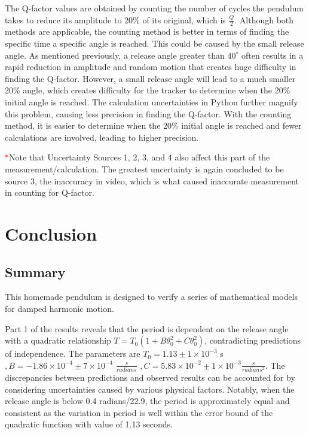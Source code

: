 \documentclass[11pt,titlepage,a4paper,twocolumn]{article}
\begin{document}
            The Q-factor values are obtained by counting the number of cycles the pendulum takes to reduce its amplitude to 20\% of its original, which is $\frac{Q}{2}$. Although both methods are applicable, the counting method is better in terms of finding the specific time a specific angle is reached. This could be caused by the small release angle. As mentioned previously, a release angle greater than $40^\circ$ often results in a rapid reduction in amplitude and random motion that creates huge difficulty in finding the Q-factor. However, a small release angle will lead to a much smaller 20\% angle, which creates difficulty for the tracker to determine when the 20\% initial angle is reached. The calculation uncertainties in Python further magnify this problem, causing less precision in finding the Q-factor. With the counting method, it is easier to determine when the 20\% initial angle is reached and fewer calculations are involved, leading to higher precision.

            \textcolor{red}{*}Note that Uncertainty Sources 1, 2, 3, and 4 also affect this part of the measurement/calculation. The greatest uncertainty is again concluded to be source 3, the inaccuracy in video, which is what caused inaccurate measurement in counting for Q-factor.

\section{Conclusion}
    \subsection{Summary}
        \hspace{\parindent}\hspace{\parindent}This homemade pendulum is designed to verify a series of mathematical models for damped harmonic motion. 
        
        Part 1 of the results reveals that the period is dependent on the release angle with a quadratic relationship $T = T_0(1 + B\theta_0^2 + C\theta_0^2)$, contradicting predictions of independence. The parameters are $T_0 = 1.13  \pm 1\times10^{-3} $ s $, B = -1.86\times10^{-4}  \pm 7\times10^{-4}$ $\frac{s}{radians}$ $, C = 5.83\times10^{-2} \pm 1\times10^{-3} \frac{s}{radians^2}$. The discrepancies between predictions and observed results can be accounted for by considering uncertainties caused by various physical factors. Notably, when the release angle is below 0.4 radians/22.9\degree, the period is approximately equal and consistent as the variation in period is well within the error bound of the quadratic function with value of 1.13 seconds.
        
\end{document}
